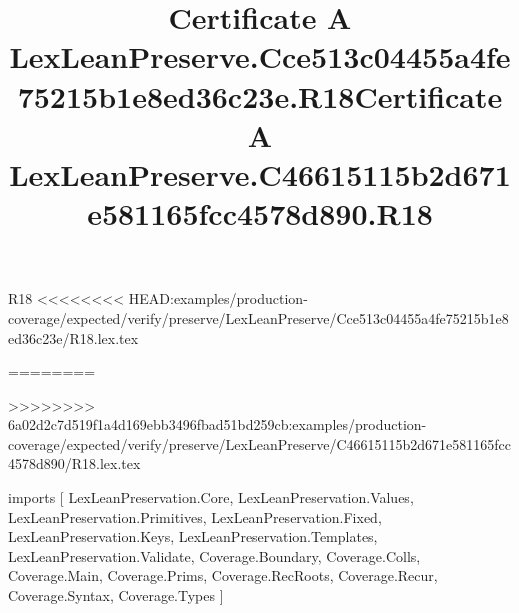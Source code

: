 \begin{lexlean}{R18}
<<<<<<<< HEAD:examples/production-coverage/expected/verify/preserve/LexLeanPreserve/Cce513c04455a4fe75215b1e8ed36c23e/R18.lex.tex
\title{Certificate A LexLeanPreserve.Cce513c04455a4fe75215b1e8ed36c23e.R18}
========
\title{Certificate A LexLeanPreserve.C46615115b2d671e581165fcc4578d890.R18}
>>>>>>>> 6a02d2c7d519f1a4d169ebb3496fbad51bd259cb:examples/production-coverage/expected/verify/preserve/LexLeanPreserve/C46615115b2d671e581165fcc4578d890/R18.lex.tex
\begin{coremodule}
imports [
  LexLeanPreservation.Core,
  LexLeanPreservation.Values,
  LexLeanPreservation.Primitives,
  LexLeanPreservation.Fixed,
  LexLeanPreservation.Keys,
  LexLeanPreservation.Templates,
  LexLeanPreservation.Validate,
  Coverage.Boundary,
  Coverage.Colls,
  Coverage.Main,
  Coverage.Prims,
  Coverage.RecRoots,
  Coverage.Recur,
  Coverage.Syntax,
  Coverage.Types
]


\end{coremodule}
\end{lexlean}
